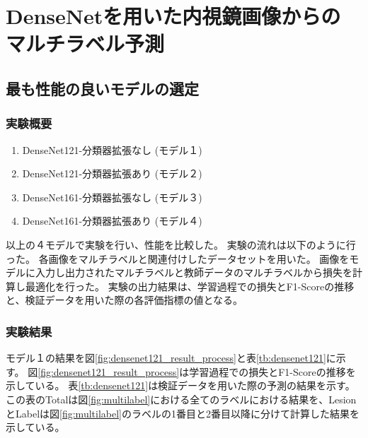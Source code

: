 \section{DenseNetを用いた内視鏡画像からの\\マルチラベル予測}
\subsection{最も性能の良いモデルの選定}
\label{sec:ex1}
\subsubsection{実験概要}
\begin{enumerate}
    \item DenseNet121-分類器拡張なし (モデル１)
    \item DenseNet121-分類器拡張あり (モデル２)
    \item DenseNet161-分類器拡張なし (モデル３)
    \item DenseNet161-分類器拡張あり (モデル４)
\end{enumerate}
以上の４モデルで実験を行い、性能を比較した。
実験の流れは以下のように行った。
各画像をマルチラベルと関連付けしたデータセットを用いた。
画像をモデルに入力し出力されたマルチラベルと教師データのマルチラベルから損失を計算し最適化を行った。
実験の出力結果は、学習過程での損失とF1-Scoreの推移と、検証データを用いた際の各評価指標の値となる。

\subsubsection{実験結果}
モデル１の結果を図\ref{fig:densenet121_result_process}と表\ref{tb:densenet121}に示す。
図\ref{fig:densenet121_result_process}は学習過程での損失とF1-Scoreの推移を示している。
表\ref{tb:densenet121}は検証データを用いた際の予測の結果を示す。
この表のTotalは図\ref{fig:multilabel}における全てのラベルにおける結果を、LesionとLabelは図\ref{fig:multilabel}のラベルの1番目と2番目以降に分けて計算した結果を示している。

